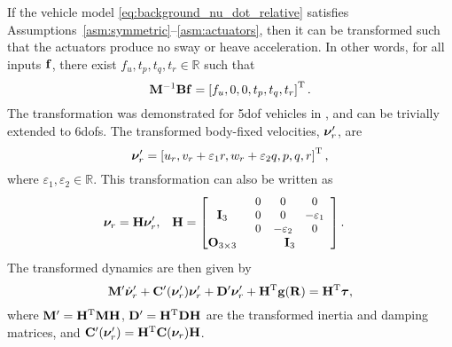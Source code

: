 If the vehicle model \eqref{eq:background_nu_dot_relative} satisfies Assumptions~\ref{asm:symmetric}--\ref{asm:actuators}, then it can be transformed such that the actuators produce no sway or heave acceleration.
In other words, for all inputs $\mathbf{f}$, there exist $f_u, t_p, t_q, t_r \in \mathbb{R}$ such that
\begin{equation}
    \mathbf{M}^{-1}\mathbf{B}\mathbf{f} = \left[f_u, 0, 0, t_p, t_q, t_r\right]^{\mathrm{T}}.
    \label{eq:neutral_point_force}
\end{equation}
The transformation was demonstrated for 5\gls{dof} vehicles in \cite{borhaug_straight_2007}, and can be trivially extended to 6\glspl{dof}.
The transformed body-fixed velocities, $\bm{\nu}_r^{\prime}$, are
\begin{equation}
    \bm{\nu}_r^{\prime} = \left[u_r, v_r + \varepsilon_1 r, w_r + \varepsilon_2 q, p, q, r\right]^{\mathrm{T}},
\end{equation}
where $\varepsilon_1, \varepsilon_2 \in \mathbb{R}$.
This transformation can also be written as
\begin{align}
    \bm{\nu}_r &= \mathbf{H}\bm{\nu}_r^{\prime}, &
    \mathbf{H} &=
    \begin{bmatrix}
        { \mathbf{I}_3} & {\small \begin{array}{ccc} 0 & 0 & 0 \\ 0 & 0 & -\varepsilon_1 \\ 0 & -\varepsilon_2 & 0 \end{array}} \\
        { \mathbf{O}_{3 \times 3}} & {\mathbf{I}_3}
    \end{bmatrix}.
    \label{eq:background_transformation}
\end{align}
The transformed dynamics are then given by
\begin{equation}
    \mathbf{M}^{\prime}\dot{\bm{\nu}}_r^{\prime} + \mathbf{C}^{\prime}(\bm{\nu}^{\prime}_r)\bm{\nu}^{\prime}_r + \mathbf{D}^{\prime}\bm{\nu}^{\prime}_r + \mathbf{H}^{\mathrm{T}}\mathbf{g}(\mathbf{R}) = \mathbf{H}^{\mathrm{T}}\bm{\tau},
\end{equation}
where $\mathbf{M}^{\prime} = \mathbf{H}^{\mathrm{T}} \mathbf{M} \mathbf{H}$, $\mathbf{D}^{\prime} = \mathbf{H}^{\mathrm{T}} \mathbf{D} \mathbf{H}$ are the transformed inertia and damping matrices, and $\mathbf{C}^{\prime}(\bm{\nu}^{\prime}_r) = \mathbf{H}^{\mathrm{T}}\mathbf{C}(\bm{\nu}_r)\mathbf{H}$.

